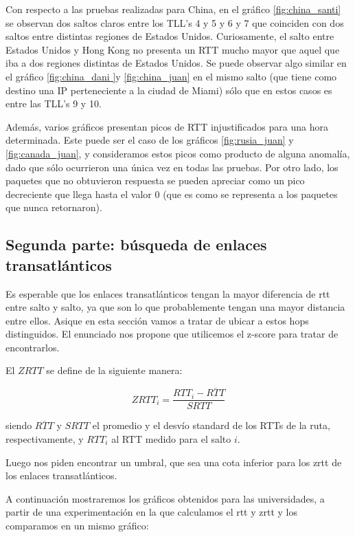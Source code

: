 Con respecto a las pruebas realizadas para China, en el gráfico \ref{fig:china_santi} se observan dos saltos claros entre los TLL's 4 y 5 y 6 y 7 que coinciden con dos saltos entre distintas regiones de Estados Unidos. Curiosamente, el salto entre Estados Unidos y Hong Kong no presenta un RTT mucho mayor que aquel que iba a dos regiones distintas de Estados Unidos. Se puede observar algo similar en el gráfico \ref{fig:china_dani }y \ref{fig:china_juan} en el mismo salto (que tiene como destino una IP perteneciente a la ciudad de Miami) sólo que en estos casos es entre las TLL's 9 y 10.

Además, varios gráficos presentan picos de RTT injustificados para una hora determinada. Este puede ser el caso de los gráficos \ref{fig:rusia_juan} y \ref{fig:canada_juan}, y consideramos estos picos como producto de alguna anomalía, dado que sólo ocurrieron una única vez en todas las pruebas. Por otro lado, los paquetes que no obtuvieron respuesta se pueden apreciar como un pico decreciente que llega hasta el valor 0 (que es como se representa a los paquetes que nunca retornaron).


\subsection{Segunda parte: búsqueda de enlaces transatlánticos}

Es esperable que los enlaces transatl\'anticos tengan la mayor diferencia de rtt entre salto y salto, ya que son lo que probablemente tengan una mayor distancia entre ellos. Asique en esta secci\'on vamos a tratar de ubicar a estos hops distinguidos. El enunciado nos propone que utilicemos el z-score para tratar de encontrarlos. 

El $ZRTT$ se define de la siguiente manera: 

\begin{equation}
 ZRTT_i = \frac{RTT_i - \overline{RTT}}{SRTT}
\end{equation}

siendo $\overline{RTT}$ y $SRTT$ el promedio y el desv\'io standard de los RTTs de la ruta, respectivamente, y $RTT_i$ al RTT medido para el salto $i$.

Luego nos piden encontrar un umbral, que sea una cota inferior para los zrtt de los enlaces transatl\'anticos. 

A continuaci\'on mostraremos los gr\'aficos obtenidos para las universidades, a partir de una experimentaci\'on en la que calculamos el rtt y zrtt y los comparamos en un mismo gr\'afico: 

